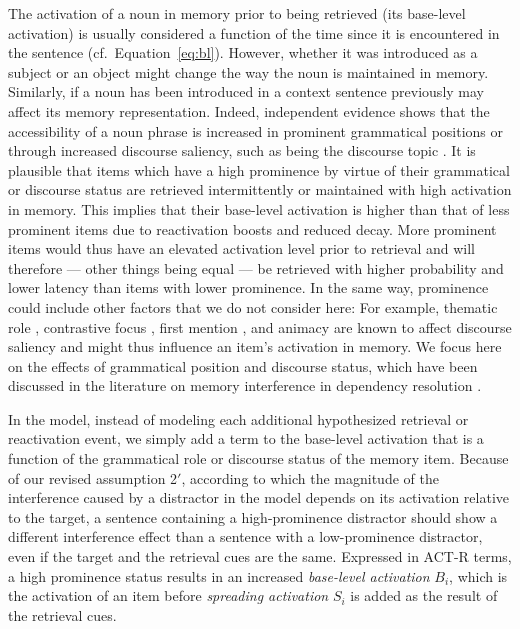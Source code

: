 \documentclass{cambridge7A}\usepackage[]{graphicx}\usepackage[]{color}
\newcommand{\revised}[1]{#1}
\begin{document}
The activation of a noun in memory prior to being retrieved (its base-level activation) is usually considered a function of the time since it is encountered in the sentence (cf.\ Equation~\ref{eq:bl}). 
However, whether it was introduced as a subject or an object might change the way the noun is maintained in memory. Similarly, if a noun has been introduced in a context sentence previously may affect its memory representation.
Indeed, independent evidence shows that the accessibility of a noun phrase is increased in prominent grammatical positions or through increased discourse saliency, \revised{such as being the discourse topic} \citep{Ariel1990,Arnold2007,  Brennan1995, Chafe1976, DuBois2003, GroszJoshiWeinstein1995,KeenanComrie1977}.
It is plausible that items which have a high prominence by virtue of their grammatical or discourse status are retrieved intermittently or maintained with high activation in memory. This implies that their base-level activation is higher than that of less prominent items due to reactivation boosts and reduced decay.
More prominent items would thus have an elevated activation level prior to retrieval and will therefore --- other things being equal --- be retrieved with higher probability and lower latency than items with lower prominence.
In the same way, prominence could include other factors that we do not consider here: For example, thematic role \citep{Arnold2001}, contrastive focus \citep{CowlesWalenskiKluender2007}, first mention \citep{GernsbacherHargreaves1988}, and animacy \citep{FukumuraVanGompel2011} are known to affect discourse saliency and might thus influence an item's activation in memory. 
We focus here on the effects of grammatical position and discourse status, which have been discussed in the literature on memory interference in dependency resolution \citep{VanDykeMcElree2011,CunningsFelser2013,PatilVasishthLewis2016,Sturt2003}.

In the model, instead of modeling each additional hypothesized retrieval or reactivation event, we simply add a term to the base-level activation that is a function of the grammatical role or discourse status of the memory item.
Because of our revised assumption 2$'$, according to which the magnitude of the interference caused by a distractor in the model depends on its activation relative to the target, a sentence containing a high-prominence distractor should show a different interference effect than a sentence with a low-prominence distractor, even if the target and the retrieval cues are the same.
Expressed in ACT-R terms, a high prominence status results in an increased \emph{base-level activation} $B_{i}$, which is the activation of an item before \emph{spreading activation} $S_{i}$ is added as the result of the retrieval cues.\label{prominenceimplementationpageref}
\end{document}
